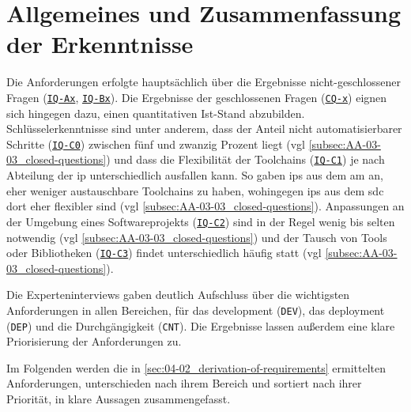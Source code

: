 \section{Allgemeines und Zusammenfassung der Erkenntnisse}
\label{sec:04-03_general-aspects-and-summery-of-findings}

Die Anforderungen  erfolgte hauptsächlich über die Ergebnisse nicht-geschlossener Fragen (\texttt{\hyperref[subsec:AA-01-01_open-questions]{IQ-Ax}}, \texttt{\hyperref[subsec:AA-01-02_half-open-questions]{IQ-Bx}}). Die Ergebnisse der geschlossenen Fragen (\texttt{\hyperref[subsec:AA-01-03_closed-questions]{CQ-x}}) eignen sich hingegen dazu, einen quantitativen Ist-Stand abzubilden. Schlüsselerkenntnisse sind unter anderem, dass der Anteil nicht automatisierbarer Schritte (\texttt{\hyperref[subsec:AA-01-03_closed-questions]{IQ-C0}}) zwischen fünf und zwanzig Prozent liegt (\acrshort{vgl} \autoref{subsec:AA-03-03_closed-questions}) und dass die Flexibilität der Toolchains (\texttt{\hyperref[subsec:AA-01-03_closed-questions]{IQ-C1}}) je nach Abteilung der \Gls{ip} unterschiedlich ausfallen kann. So gaben \Glspl{ip} aus dem \Gls{am} an, eher weniger austauschbare Toolchains zu haben, wohingegen \Glspl{ip} aus dem \Gls{sdc} dort eher flexibler sind (\acrshort{vgl} \autoref{subsec:AA-03-03_closed-questions}). Anpassungen an der Umgebung eines Softwareprojekts (\texttt{\hyperref[subsec:AA-01-03_closed-questions]{IQ-C2}}) sind in der Regel wenig bis selten notwendig (\acrshort{vgl} \autoref{subsec:AA-03-03_closed-questions}) und der Tausch von Tools oder Bibliotheken (\texttt{\hyperref[subsec:AA-01-03_closed-questions]{IQ-C3}}) findet unterschiedlich häufig statt (\acrshort{vgl} \autoref{subsec:AA-03-03_closed-questions}).

Die Experteninterviews gaben deutlich Aufschluss über die wichtigsten Anforderungen in allen Bereichen, für das \Gls{development} (\texttt{DEV}), das \Gls{deployment} (\texttt{DEP}) und die Durchgängigkeit (\texttt{CNT}). Die Ergebnisse lassen außerdem eine klare Priorisierung der Anforderungen zu.

Im Folgenden werden die in \autoref{sec:04-02_derivation-of-requirements} ermittelten Anforderungen, unterschieden nach ihrem Bereich und sortiert nach ihrer Priorität, in klare Aussagen zusammengefasst.

